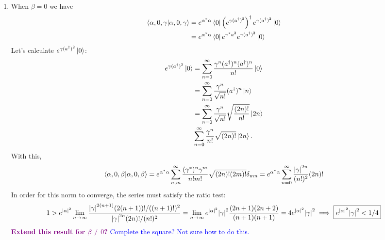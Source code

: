 \documentclass{article}
\theoremstyle{definition}
\newcommand{\al}{\alpha}
\newcommand{\be}{\beta}
\newcommand{\f}[2]{\frac{#1}{#2}}
\newcommand{\lp}{\left(}
\newcommand{\rp}{\right)}
\begin{document}
\begin{enumerate}[label=(\alph*)]
	\item When $\be = 0$ we have
	\begin{align*}
	\braket{\al,0,\gamma} 
	&= e^{\al^* \al} \bra{0} \lp e^{\gamma(a^\dagger)^2}\rp^\dagger e^{\gamma(a^\dagger)^2} \ket{0} \\
	&= e^{\al^* \al}\bra{0} e^{\gamma^* a^2 } e^{\gamma (a^\dagger)^2} \ket{0}
	\end{align*} 
	Let's calculate $e^{\gamma (a^\dagger)^2}\ket{0}$:
	\begin{align*}
	e^{\gamma (a^\dagger)^2}\ket{0} 
	&= \sum^\infty_{n=0}\f{\gamma^n (a^\dagger)^n (a^\dagger)^n}{n!}\ket{0} \\
	&= \sum^\infty_{n=0}\f{\gamma^n}{\sqrt{n!}} (a^\dagger)^n \ket{n} \\
	&= \sum^\infty_{n=0}\f{\gamma^n}{\sqrt{n!}} \sqrt{\f{(2n)!}{n!}} \ket{2n} \\
	& \sum^\infty_{n=0} \f{\gamma^n}{n!} \sqrt{(2n)!} \ket{2n}.
	\end{align*}
	With this, 
	\begin{align*}
	\braket{\al,0,\be} = e^{\al^*\al}\sum^\infty_{n,m} \f{(\gamma^*)^n\gamma^m}{n!m!}\sqrt{(2n)!(2m)!}\delta_{mn} = e^{\al^*\al}\sum^\infty_{n=0} \f{\abs{\gamma}^{2n}}{(n!)^2} (2n)!
	\end{align*}
	In order for this norm to converge, the series must satisfy the ratio test:
	\begin{align*}
	1 > e^{\abs{\al}^2}\lim_{n\to \infty} \f{\abs{\gamma}^{2(n+1)} (2(n+1))!/((n+1)!)^2}{\abs{\gamma}^{2n} (2n)!/(n!)^2} = \lim_{n\to \infty}  e^{\abs{\al}^2}\abs{\gamma}^2 \f{(2n+1)(2n+2)}{(n+1)(n+1)} = 4 e^{\abs{\al}^2}\abs{\gamma}^2 \implies  \boxed{e^{\abs{\al}^2}\abs{\gamma}^2 < 1/4}
	\end{align*}
	\textbf{\textcolor{purple}{Extend this result for $\be \neq 0$?}} \textcolor{blue}{Complete the square? Not sure how to do this.}
	

\end{enumerate}
\end{document}
